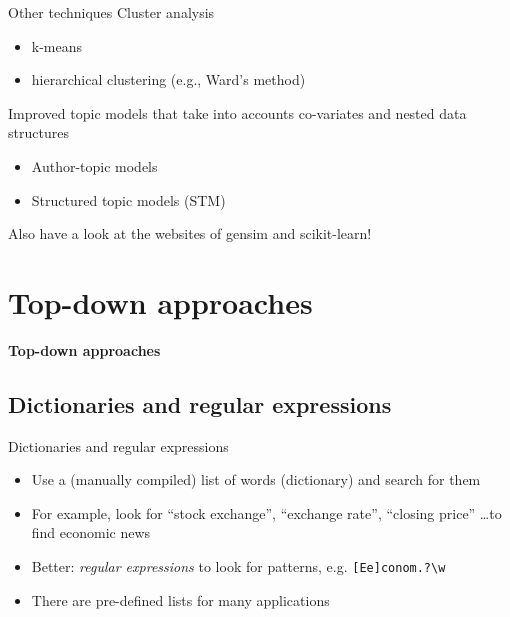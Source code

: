 \documentclass{beamer}
\begin{document}
\begin{frame}{Other techniques}
Cluster analysis
\begin{itemize}
	\item k-means
	\item hierarchical clustering (e.g., Ward's method)
\end{itemize}

Improved topic models that take into accounts co-variates and nested data structures
\begin{itemize}
	\item Author-topic models
	\item Structured topic models (STM)
\end{itemize}

Also have a look at the websites of gensim and scikit-learn!
\end{frame}


%
%
%	


\section{Top-down approaches}

\begin{frame}[plain]
	\textbf{Top-down approaches}
\end{frame}


\subsection{Dictionaries and regular expressions}

\begin{frame}{Dictionaries and regular expressions}
\begin{itemize}
	\item Use a (manually compiled) list of words (dictionary) and search for them
	\item For example, look for ``stock exchange'', ``exchange rate'', ``closing price'' \ldots to find economic news
	\item Better: \textit{regular expressions} to look for patterns, e.g. \texttt{[Ee]conom.?\textbackslash w}
	\item There are pre-defined lists for many applications
\end{itemize}	

\end{frame}
\end{document}
